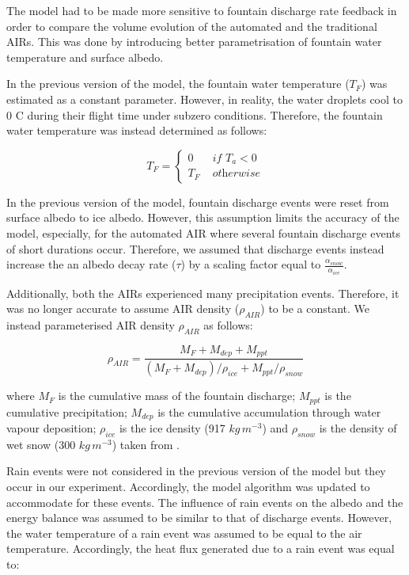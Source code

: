 \documentclass[tc, manuscript]{copernicus}
\begin{document}
The model had to be made more sensitive to fountain discharge rate feedback in order to compare the volume
evolution of the automated and the traditional AIRs. This was done by introducing better parametrisation of
fountain water temperature and surface albedo. 

In the previous version of the model, the fountain water temperature ($T_F$) was estimated as a constant
parameter. However, in reality, the water droplets cool to 0 C during their flight time under subzero
conditions. Therefore, the fountain water temperature was instead determined as follows:

\begin{equation}
	T_{F} = \left\{ \begin{array}{ll}
		0 & \textit{ if } T_{a} < 0 \\
		T_{F} & \textit{ otherwise}
	\end{array} \right.
\end{equation}

In the previous version of the model, fountain discharge events were reset from surface albedo to ice albedo.
However, this assumption limits the accuracy of the model, especially, for the automated AIR where several
fountain discharge events of short durations occur. Therefore, we assumed that discharge events instead
increase the an albedo decay rate ($\tau$) by a scaling factor equal to $\frac{\alpha_{snow}}{\alpha_{ice}}$.

Additionally, both the AIRs experienced many precipitation events. Therefore, it was no longer accurate to
assume AIR density ($\rho_{AIR}$) to be a constant. We instead parameterised AIR density $\rho_{AIR}$ as follows:

\begin{equation}
  \rho_{AIR} = \frac{M_{F} + M_{dep} + M_{ppt}}{(M_{F} + M_{dep})/\rho_{ice} + M_{ppt}/\rho_{snow}}
\end{equation}

where $M_F$ is the cumulative mass of the fountain discharge; $M_{ppt}$ is the cumulative precipitation; $M_{dep}$ is the cumulative accumulation through water vapour deposition; $\rho_{ice}$ is the ice density (917 $kg\,m^{-3}$) and $\rho_{snow}$ is the density of wet snow (300 $kg\,m^{-3}$) taken from
\cite{cuffeyPhysicsGlaciers2010} .

Rain events were not considered in the previous version of the model but they occur in our experiment.
Accordingly, the model algorithm was updated to accommodate for these events. The influence of rain events on the
albedo and the energy balance was assumed to be similar to that of discharge events. However, the water
temperature of a rain event was assumed to be equal to the air temperature. Accordingly, the heat flux generated
due to a rain event was equal to:
\end{document}
